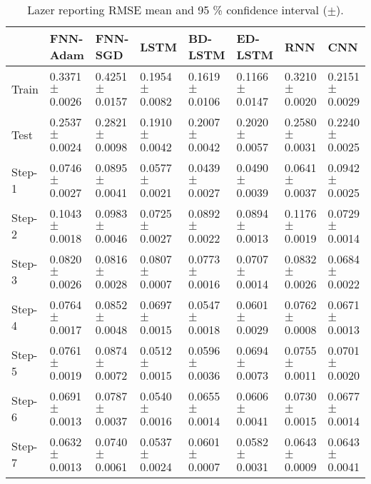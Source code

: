\documentclass{ieeeaccess}
\begin{document}
\begin{table*}[htbp]
 \smaller 
 \caption{Lazer reporting RMSE mean and 95 \% confidence interval   ($\pm$).}
\label{tab:lazer}
\begin{tabular}{llllllll}
\hline
 &  FNN-Adam& FNN-SGD & LSTM & BD-LSTM  & ED-LSTM & RNN &CNN\\
\hline
\hline
									
Train &  0.3371 $\pm$  0.0026 & 0.4251 $\pm$   0.0157  & 0.1954 $\pm$   0.0082  & 0.1619 $\pm$  0.0106 &  0.1166 $\pm$  0.0147  &  0.3210 $\pm$  0.0020  & 0.2151$\pm$	0.0029\\

Test &  0.2537 $\pm$  0.0024 & 0.2821 $\pm$   0.0098  & 0.1910 $\pm$   0.0042  &  0.2007 $\pm$  0.0042 &  0.2020 $\pm$  0.0057  &  0.2580 $\pm$  0.0031  & 0.2240$\pm$	0.0025\\

Step-1 &  0.0746 $\pm$  0.0027 & 0.0895 $\pm$   0.0041  & 0.0577 $\pm$   0.0021  &  0.0439 $\pm$  0.0027 & 0.0490 $\pm$  0.0039  &  0.0641 $\pm$  0.0037 & 0.0942$\pm$	0.0025\\

Step-2 &  0.1043 $\pm$  0.0018 & 0.0983 $\pm$   0.0046  & 0.0725 $\pm$ 0.0027  &  0.0892 $\pm$  0.0022 &  0.0894 $\pm$  0.0013  & 0.1176 $\pm$  0.0019  & 0.0729$\pm$	0.0014\\

Step-3 &  0.0820 $\pm$ 0.0026 & 0.0816 $\pm$   0.0028  & 0.0807 $\pm$   0.0007  &  0.0773 $\pm$ 0.0016 & 0.0707 $\pm$  0.0014  & 0.0832 $\pm$ 0.0026 & 0.0684$\pm$	0.0022\\

Step-4 &  0.0764 $\pm$ 0.0017 &0.0852 $\pm$   0.0048  &0.0697 $\pm$   0.0015  &  0.0547 $\pm$ 0.0018 &  0.0601 $\pm$  0.0029  & 0.0762 $\pm$  0.0008  &	0.0671$\pm$	0.0013 \\

Step-5 &  0.0761 $\pm$  0.0019 & 0.0874 $\pm$  0.0072  & 0.0512 $\pm$   0.0015  &  0.0596 $\pm$  0.0036 &  0.0694 $\pm$  0.0073  &  0.0755 $\pm$ 0.0011 & 0.0701$\pm$	0.0020\\

Step-6 &  0.0691 $\pm$  	0.0013 & 0.0787 $\pm$   0.0037  & 0.0540 $\pm$  0.0016 &  0.0655 $\pm$  	0.0014 &  0.0606 $\pm$  0.0041  & 0.0730 $\pm$  0.0015&  0.0677	$\pm$0.0014 \\

Step-7 &  0.0632 $\pm$  0.0013 & 0.0740 $\pm$   	0.0061  & 0.0537 $\pm$   0.0024  & 0.0601 $\pm$  0.0007 &  0.0582 $\pm$  0.0031  &  0.0643 $\pm$ 	0.0009& 	0.0643 $\pm$	0.0041 \\


\end{tabular}
\end{table*}
\end{document}
